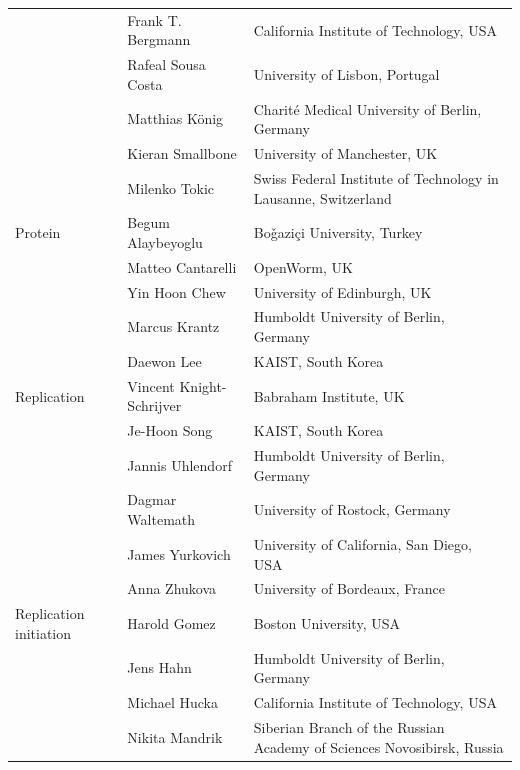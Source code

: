 \documentclass[journal,transmag]{IEEEtran}
\begin{document}
\begin{table}[ht!]
\begin{tabularx}{\textwidth}{l||l||X}
                       & Frank T. Bergmann                & California Institute of Technology, USA\\
                       & Rafeal Sousa Costa               & University of Lisbon, Portugal\\
                       & Matthias K\"onig                 & Charit\'e Medical University of Berlin, Germany\\
                       & Kieran Smallbone                 & University of Manchester, UK\\
                       & Milenko Tokic                    & Swiss Federal Institute of Technology in Lausanne, Switzerland\\\hline
Protein                & Begum Alaybeyoglu                & Bo\v{g}azi\c{c}i University, Turkey\\
                       & Matteo Cantarelli                & OpenWorm, UK\\
                       & Yin Hoon Chew                    & University of Edinburgh, UK\\
                       & Marcus Krantz                    & Humboldt University of Berlin, Germany\\
                       & Daewon Lee                       & KAIST, South Korea\\\hline
Replication            & Vincent Knight-Schrijver         & Babraham Institute, UK\\
                       & Je-Hoon Song                     & KAIST, South Korea\\
                       & Jannis Uhlendorf                 & Humboldt University of Berlin, Germany\\
                       & Dagmar Waltemath                 & University of Rostock, Germany\\
                       & James Yurkovich                  & University of California, San Diego, USA\\
                       & Anna Zhukova                     & University of Bordeaux, France\\\hline
Replication initiation & Harold Gomez                     & Boston University, USA\\
                       & Jens Hahn                        & Humboldt University of Berlin, Germany\\
                       & Michael Hucka                    & California Institute of Technology, USA\\
                       & Nikita Mandrik                   & Siberian Branch of the Russian Academy of Sciences Novosibirsk, Russia\\

\end{tabularx}
\end{table}
\end{document}
